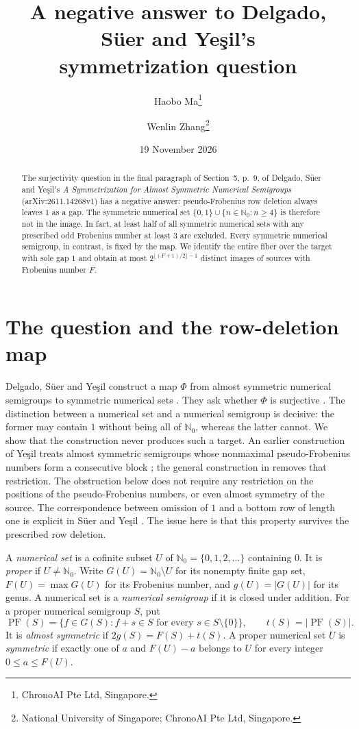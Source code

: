 \documentclass[11pt]{article}
\title{A negative answer to Delgado, S\"uer and Ye\c{s}il's\protect\\symmetrization question}
\author{Haobo Ma\thanks{ChronoAI Pte Ltd, Singapore.}
\and Wenlin Zhang\thanks{National University of Singapore; ChronoAI Pte Ltd, Singapore.}}
\date{19 November 2026}
\newcommand{\N}{\mathbb{N}_0}
\newcommand{\PF}{\operatorname{PF}}
\begin{document}
\maketitle
\begin{abstract}
The surjectivity question in the final paragraph of Section~5, p.~9,
of Delgado, S\"uer and Ye\c{s}il's \emph{A Symmetrization for Almost
Symmetric Numerical Semigroups} (arXiv:2611.14268v1) has a negative answer:
pseudo-Frobenius row deletion always leaves $1$ as a gap.
The symmetric numerical set $\{0,1\}\cup\{n\in\N:n\geq4\}$ is therefore
not in the image. In fact, at least half of all symmetric numerical sets
with any prescribed odd Frobenius number at least $3$ are excluded.
Every symmetric numerical semigroup, in contrast, is fixed by the map.
We identify the entire fiber over the target with sole gap $1$ and obtain
at most $2^{\lfloor(F+1)/2\rfloor-1}$ distinct images of sources with
Frobenius number $F$.
\end{abstract}

\section{The question and the row-deletion map}
Delgado, S\"uer and Ye\c{s}il construct a map $\Phi$ from almost symmetric
numerical semigroups to symmetric numerical sets \cite[Theorem~4.2]{DSY}.
They ask whether $\Phi$ is surjective \cite[Section~5, p.~9, final paragraph]{DSY}.
The distinction between a numerical set and a numerical semigroup is decisive:
the former may contain $1$ without being all of $\N$, whereas the latter cannot.
We show that the construction never produces such a target.
An earlier construction of Ye\c{s}il treats almost symmetric semigroups whose
nonmaximal pseudo-Frobenius numbers form a consecutive block
\cite[Lemma~5.7]{Y}; the general construction in \cite[Theorem~4.2]{DSY}
removes that restriction. The obstruction below does not require any
restriction on the positions of the pseudo-Frobenius numbers, or even
almost symmetry of the source.
The correspondence between omission of $1$ and a bottom row of length one
is explicit in S\"uer and Ye\c{s}il \cite[Proposition~3.5 and Corollary~3.6]{SY}.
The issue here is that this property survives the prescribed row deletion.

A \emph{numerical set} is a cofinite subset $U$ of
$\N=\{0,1,2,\ldots\}$ containing $0$. It is \emph{proper} if $U\ne\N$.
Write $G(U)=\N\setminus U$ for its nonempty finite gap set,
$F(U)=\max G(U)$ for its Frobenius number, and $g(U)=|G(U)|$ for its genus.
A numerical set is a \emph{numerical semigroup} if it is closed under addition.
For a proper numerical semigroup $S$, put
\[
 \PF(S)=\{f\in G(S): f+s\in S\text{ for every }s\in S\setminus\{0\}\},
 \qquad t(S)=|\PF(S)|.
\]
It is \emph{almost symmetric} if $2g(S)=F(S)+t(S)$.
A proper numerical set $U$ is \emph{symmetric} if exactly one of $a$ and
$F(U)-a$ belongs to $U$ for every integer $0\leq a\leq F(U)$.
\end{document}
